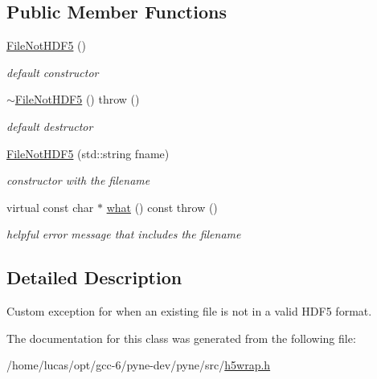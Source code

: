 \subsection*{Public Member Functions}
\begin{DoxyCompactItemize}
\item 
\hyperlink{classh5wrap_1_1_file_not_h_d_f5_a3fa40cb39abaa241e80ee97a13e69815}{File\+Not\+H\+D\+F5} ()\hypertarget{classh5wrap_1_1_file_not_h_d_f5_a3fa40cb39abaa241e80ee97a13e69815}{}\label{classh5wrap_1_1_file_not_h_d_f5_a3fa40cb39abaa241e80ee97a13e69815}

\begin{DoxyCompactList}\small\item\em default constructor \end{DoxyCompactList}\item 
\hyperlink{classh5wrap_1_1_file_not_h_d_f5_a55276b2bc97da82f25a0718327b00742}{$\sim$\+File\+Not\+H\+D\+F5} ()  throw ()\hypertarget{classh5wrap_1_1_file_not_h_d_f5_a55276b2bc97da82f25a0718327b00742}{}\label{classh5wrap_1_1_file_not_h_d_f5_a55276b2bc97da82f25a0718327b00742}

\begin{DoxyCompactList}\small\item\em default destructor \end{DoxyCompactList}\item 
\hyperlink{classh5wrap_1_1_file_not_h_d_f5_ac6f9e6588f3a55f26fe6cd13ab75425b}{File\+Not\+H\+D\+F5} (std\+::string fname)\hypertarget{classh5wrap_1_1_file_not_h_d_f5_ac6f9e6588f3a55f26fe6cd13ab75425b}{}\label{classh5wrap_1_1_file_not_h_d_f5_ac6f9e6588f3a55f26fe6cd13ab75425b}

\begin{DoxyCompactList}\small\item\em constructor with the filename \end{DoxyCompactList}\item 
virtual const char $\ast$ \hyperlink{classh5wrap_1_1_file_not_h_d_f5_afce2273e3c8d54802598bdc30cdedec2}{what} () const   throw ()\hypertarget{classh5wrap_1_1_file_not_h_d_f5_afce2273e3c8d54802598bdc30cdedec2}{}\label{classh5wrap_1_1_file_not_h_d_f5_afce2273e3c8d54802598bdc30cdedec2}

\begin{DoxyCompactList}\small\item\em helpful error message that includes the filename \end{DoxyCompactList}\end{DoxyCompactItemize}


\subsection{Detailed Description}
Custom exception for when an existing file is not in a valid H\+D\+F5 format. 

The documentation for this class was generated from the following file\+:\begin{DoxyCompactItemize}
\item 
/home/lucas/opt/gcc-\/6/pyne-\/dev/pyne/src/\hyperlink{h5wrap_8h}{h5wrap.\+h}\end{DoxyCompactItemize}
